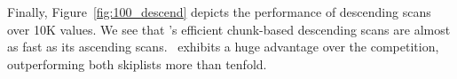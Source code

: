 
Finally, Figure~\ref{fig:100_descend} depicts the performance of descending scans over 10K values. 
We see that \oak's efficient chunk-based descending scans are almost as fast as its ascending scans. 
\oak\ exhibits a huge advantage over the competition, outperforming both skiplists more than tenfold. 





 